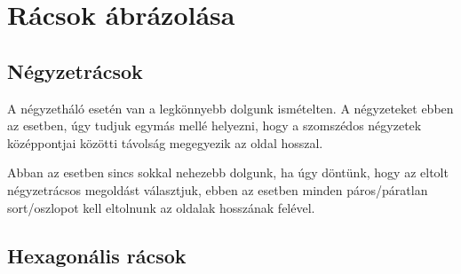 \section{Rácsok ábrázolása}

\subsection{Négyzetrácsok}

A négyzetháló esetén van a legkönnyebb dolgunk ismételten. A négyzeteket ebben az esetben, úgy tudjuk egymás mellé helyezni, hogy a szomszédos négyzetek középpontjai közötti távolság megegyezik az oldal hosszal. 

Abban az esetben sincs sokkal nehezebb dolgunk, ha úgy döntünk, hogy az eltolt négyzetrácsos megoldást választjuk, ebben az esetben minden páros/páratlan sort/oszlopot kell eltolnunk az oldalak hosszának felével.

\subsection{Hexagonális rácsok}

